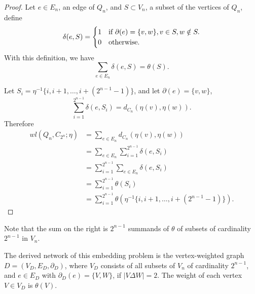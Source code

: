 \documentclass[12pt]{ucthesis}
\theoremstyle{plain}
\theoremstyle{definition}
\begin{document}
\begin{proof}
Let $e \in E_n$, an edge of $Q_n$,
and $S \subset V_n$, a subset of the vertices of $Q_n$, define
\begin{equation*}
\delta(e, S) = \begin{cases}
	1 & \textnormal{if } \partial(e) = \{v, w\}, v \in S, w \notin S. \\
	0 & \textnormal{otherwise}.
\end{cases}
\end{equation*}
With this definition, we have
\begin{equation*}
\sum_{e \in E_n} \delta(e, S) = \theta(S).
\end{equation*}

Let $S_i = \eta^{-1}\{i, i + 1, \dots, i + (2^{n - 1} - 1)\}$,
and let $\partial(e) = \{v, w\}$,
\begin{equation*}
\sum_{i = 1}^{2^{n - 1}} \delta(e, S_i) = d_{C_n}(\eta(v), \eta(w)).
\end{equation*}
Therefore
\begin{align*}
wl(Q_n, C_{2^n}; \eta)
& = \sum_{e \in E_n} d_{C_n}(\eta(v), \eta(w)) \\
& = \sum_{e \in E_n} \sum_{i = 1}^{2^{n - 1}} \delta(e, S_i) \\
& = \sum_{i = 1}^{2^{n - 1}} \sum_{e \in E_n} \delta(e, S_i) \\
& = \sum_{i = 1}^{2^{n - 1}} \theta(S_i) \\
& = \sum_{i = 1}^{2^{n - 1}} \theta(\eta^{-1}\{i, i + 1, \dots, i + (2^{n - 1} - 1)\}).
\end{align*}
\end{proof}

Note that the sum on the right is $2^{n - 1}$ summands of $\theta$ of subsets of
cardinality $2^{n - 1}$ in $V_n$.

The derived network of this embedding problem is the vertex-weighted graph $D = (V_D, E_D, \partial_D)$,
where $V_D$ consists of all subsets of $V_n$ of cardinality $2^{n - 1}$,
and $e \in E_D$ with $\partial_D(e) = \{V, W\}$, if $|V \Delta W| = 2$.
The weight of each vertex $V \in V_D$ is $\theta(V)$.
\end{document}
